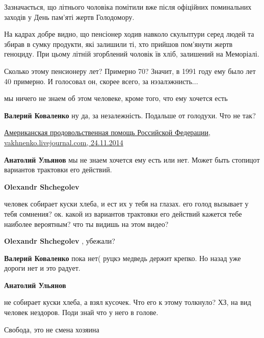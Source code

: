\begin{itemize}
\begin{multicols}{2}
Зазначається, що літнього чоловіка помітили вже після офіційних поминальних
заходів у День пам’яті жертв Голодомору.

На кадрах добре видно, що пенсіонер ходив навколо скульптури серед людей та
збирав в сумку продукти, які залишили ті, хто прийшов пом’янути жертв геноциду.
При цьому літній згорблений чоловік їв хліб, залишений на Меморіалі.

\end{multicols}


Сколько этому пенсионеру лет? Примерно 70? Значит, в 1991 году ему было лет 40
примерно. И голосовал он, скорее всего, за нэзалэжнисть...

\begin{itemize} %
мы ничего не знаем об этом человеке, кроме того, что ему хочется есть


\textbf{Валерий Коваленко} ну да, за незалежність. Подальше от голодухи. Что не так?

\href{https://vakhnenko.livejournal.com/175302.html}{%
Американская продовольственная помощь Российской Федерации, vakhnenko.livejournal.com, 24.11.2014%
}

\textbf{Анатолий Ульянов} мы не знаем хочется ему есть или нет. Может быть стопицот вариантов трактовки его действий.

\textbf{Olexandr Shchegolev} 

человек собирает куски хлеба, и ест их у тебя на глазах. его голод вызывает у
тебя сомнения? ок. какой из вариантов трактовки его действий кажется тебе
наиболее вероятным? что ты видишь на этом видео?

\textbf{Olexandr Shchegolev} , убежали?

\textbf{Валерий Коваленко} пока нет( руцкэ медведь держит крепко. Но назад уже дороги нет и это радует.

\textbf{Анатолий Ульянов} 

не собирает куски хлеба, а взял кусочек. Что его к этому толкнуло? ХЗ, на вид
человек нездоров. Поди знай что у него в голове.

\end{itemize} %

Свобода, это не смена хозяина


\end{itemize}

